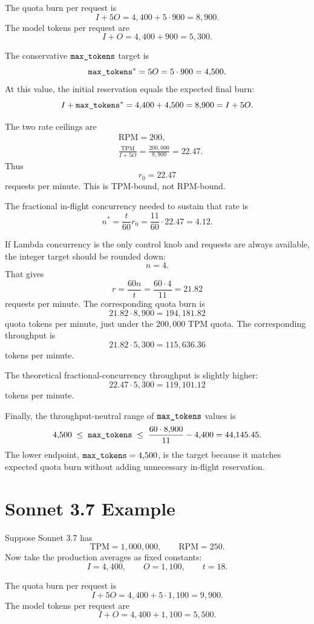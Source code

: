 \documentclass[12pt]{extarticle}
\newcommand{\maxtok}{\text{\texttt{max\_tokens}}}
\newcommand{\inputtokens}{I}
\newcommand{\outputtokens}{O}
\newcommand{\TPM}{\text{TPM}}
\newcommand{\RPM}{\text{RPM}}
\begin{document}
The quota burn per request is
\[
\inputtokens + 5\outputtokens
= 4{,}400 + 5 \cdot 900
= 8{,}900.
\]
The model tokens per request are
\[
\inputtokens + \outputtokens
= 4{,}400 + 900
= 5{,}300.
\]

The conservative $\maxtok$ target is
\[
\maxtok^* = 5\outputtokens = 5 \cdot 900 = 4{,}500.
\]
At this value, the initial reservation equals the expected final burn:
\[
\inputtokens + \maxtok^*
= 4{,}400 + 4{,}500
= 8{,}900
= \inputtokens + 5\outputtokens.
\]

The two rate ceilings are
\[
\begin{aligned}
&\RPM = 200,\\
&\frac{\TPM}{\inputtokens + 5\outputtokens}
=
\frac{200{,}000}{8{,}900}
=
22.47.
\end{aligned}
\]
Thus
\[
r_0 = 22.47
\]
requests per minute. This is TPM-bound, not RPM-bound.

The fractional in-flight concurrency needed to sustain that rate is
\[
n^*
=
\frac{t}{60}r_0
=
\frac{11}{60} \cdot 22.47
=
4.12.
\]

If Lambda concurrency is the only control knob and requests are always available, the integer target should be rounded down:
\[
n = 4.
\]
That gives
\[
r = \frac{60n}{t}
  = \frac{60 \cdot 4}{11}
  = 21.82
\]
requests per minute. The corresponding quota burn is
\[
21.82 \cdot 8{,}900 = 194{,}181.82
\]
quota tokens per minute, just under the $200{,}000$ TPM quota. The corresponding throughput is
\[
21.82 \cdot 5{,}300
= 115{,}636.36
\]
tokens per minute.

The theoretical fractional-concurrency throughput is slightly higher:
\[
22.47 \cdot 5{,}300
=
119{,}101.12
\]
tokens per minute.

Finally, the throughput-neutral range of $\maxtok$ values is
\[
4{,}500
\;\leq\;
\maxtok
\;\leq\;
\frac{60 \cdot 8{,}900}{11} - 4{,}400
=
44{,}145.45.
\]
The lower endpoint, $\maxtok = 4{,}500$, is the target because it matches expected quota burn without adding unnecessary in-flight reservation.

\section{Sonnet 3.7 Example}

Suppose Sonnet 3.7 has
\[
\TPM = 1{,}000{,}000, \qquad \RPM = 250.
\]
Now take the production averages as fixed constants:
\[
\inputtokens = 4{,}400, \qquad
\outputtokens = 1{,}100, \qquad
t = 18.
\]

The quota burn per request is
\[
\inputtokens + 5\outputtokens
= 4{,}400 + 5 \cdot 1{,}100
= 9{,}900.
\]
The model tokens per request are
\[
\inputtokens + \outputtokens
= 4{,}400 + 1{,}100
= 5{,}500.
\]
\end{document}
